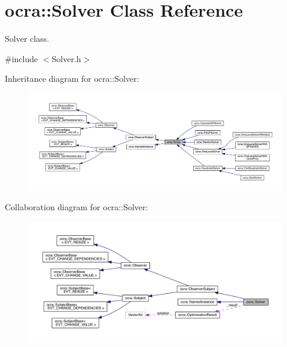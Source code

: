 \hypertarget{classocra_1_1Solver}{}\section{ocra\+:\+:Solver Class Reference}
\label{classocra_1_1Solver}


Solver class.  




{\ttfamily \#include $<$Solver.\+h$>$}



Inheritance diagram for ocra\+:\+:Solver\+:\nopagebreak
\begin{figure}[H]
\begin{center}
\leavevmode
\includegraphics[width=350pt]{d1/dd1/classocra_1_1Solver__inherit__graph}
\end{center}
\end{figure}


Collaboration diagram for ocra\+:\+:Solver\+:\nopagebreak
\begin{figure}[H]
\begin{center}
\leavevmode
\includegraphics[width=350pt]{da/dc7/classocra_1_1Solver__coll__graph}
\end{center}
\end{figure}
